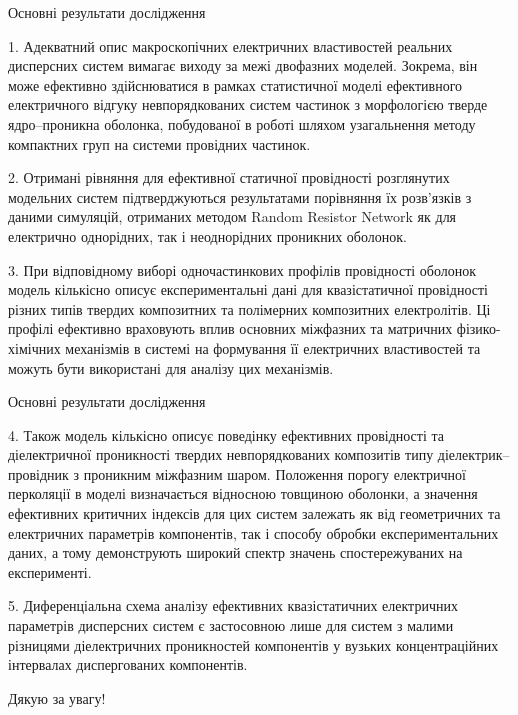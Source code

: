 \documentclass[10pt]{beamer}
\begin{document}
\begin{frame}{Основні результати дослідження}
\footnotesize

1. Адекватний опис макроскопічних електричних властивостей реальних дисперсних систем вимагає виходу за межі двофазних моделей. Зокрема, він може ефективно здійснюватися в рамках статистичної моделі ефективного електричного відгуку невпорядкованих систем частинок з морфологією тверде ядро--проникна оболонка, побудованої в роботі шляхом узагальнення методу компактних груп на системи провідних частинок.

2. Отримані рівняння для ефективної статичної провідності розглянутих модельних систем підтверджуються результатами порівняння їх розв'язків з даними симуляцій, отриманих методом Random Resistor Network як для електрично однорідних, так і неоднорідних проникних оболонок. 

3. При відповідному виборі одночастинкових профілів провідності оболонок модель кількісно описує експериментальні дані для квазістатичної провідності різних типів твердих композитних та полімерних композитних електролітів. Ці профілі ефективно враховують вплив основних міжфазних та матричних фізико-хімічних механізмів в системі на формування її електричних властивостей та можуть бути використані для аналізу цих механізмів.

\end{frame}

\begin{frame}{Основні результати дослідження}
\footnotesize

4. Також модель кількісно описує поведінку ефективних провідності та діелектричної проникності твердих невпорядкованих композитів типу діелектрик--провідник з проникним міжфазним шаром. Положення порогу електричної перколяції в моделі визначається відносною товщиною оболонки, а значення ефективних критичних індексів для цих систем залежать як від геометричних та електричних параметрів компонентів, так і способу обробки експериментальних даних, а тому демонструють широкий спектр значень спостережуваних на експерименті.

5. Диференціальна схема аналізу ефективних квазістатичних електричних параметрів дисперсних систем є застосовною лише для систем з малими різницями діелектричних проникностей компонентів у вузьких концентраційних інтервалах диспергованих компонентів.

\end{frame}

{
\begin{frame}[standout]
  Дякую за увагу!
\end{frame}
}
\end{document}
